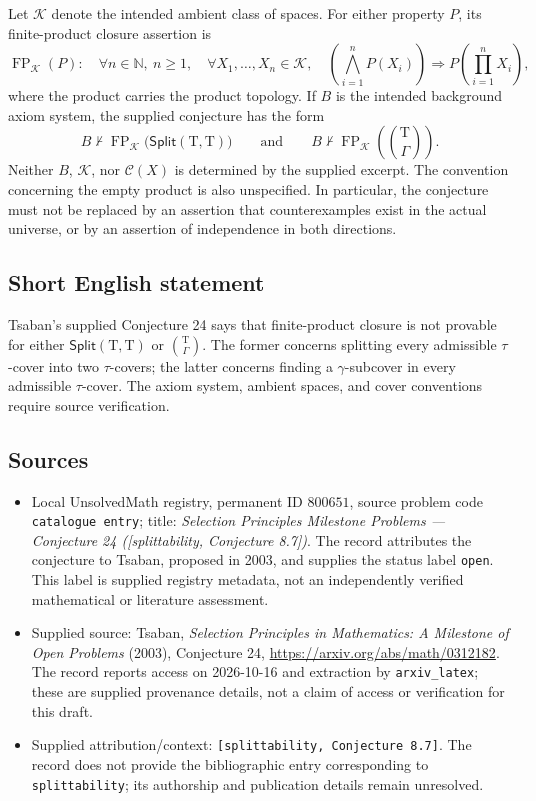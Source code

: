 \documentclass[11pt]{article}
\newcommand{\N}{\mathbb{N}}
\begin{document}
Let $\mathscr K$ denote the intended ambient class of spaces. For either property $P$, its finite-product closure assertion is
\[
\operatorname{FP}_{\mathscr K}(P):\quad
\forall n\in\N,\ n\geq1,\quad
\forall X_1,\ldots,X_n\in\mathscr K,\quad
\left(\bigwedge_{i=1}^{n}P(X_i)\right)
\Longrightarrow P\!\left(\prod_{i=1}^{n}X_i\right),
\]
where the product carries the product topology. If $B$ is the intended background axiom system, the supplied conjecture has the form
\[
B\nvdash\operatorname{FP}_{\mathscr K}\bigl(\mathsf{Split}(\mathrm T,\mathrm T)\bigr)
\qquad\text{and}\qquad
B\nvdash\operatorname{FP}_{\mathscr K}\!\left(\binom{\mathrm T}{\Gamma}\right).
\]
Neither $B$, $\mathscr K$, nor $\mathcal C(X)$ is determined by the supplied excerpt. The convention concerning the empty product is also unspecified. In particular, the conjecture must not be replaced by an assertion that counterexamples exist in the actual universe, or by an assertion of independence in both directions.
\subsection{Short English statement}
Tsaban's supplied Conjecture 24 says that finite-product closure is not provable for either $\mathsf{Split}(\mathrm T,\mathrm T)$ or $\binom{\mathrm T}{\Gamma}$. The former concerns splitting every admissible $\tau$-cover into two $\tau$-covers; the latter concerns finding a $\gamma$-subcover in every admissible $\tau$-cover. The axiom system, ambient spaces, and cover conventions require source verification.
\subsection{Sources}
\begin{itemize}
\item Local UnsolvedMath registry, permanent ID $800651$, source problem code \texttt{catalogue entry}; title: \emph{Selection Principles Milestone Problems --- Conjecture 24 ([splittability, Conjecture 8.7])}. The record attributes the conjecture to Tsaban, proposed in 2003, and supplies the status label \texttt{open}. This label is supplied registry metadata, not an independently verified mathematical or literature assessment.
\item Supplied source: Tsaban, \emph{Selection Principles in Mathematics: A Milestone of Open Problems} (2003), Conjecture 24, \url{https://arxiv.org/abs/math/0312182}. The record reports access on 2026-10-16 and extraction by \texttt{arxiv\_latex}; these are supplied provenance details, not a claim of access or verification for this draft.
\item Supplied attribution/context: \texttt{[splittability, Conjecture 8.7]}. The record does not provide the bibliographic entry corresponding to \texttt{splittability}; its authorship and publication details remain unresolved.
\end{itemize}
\end{document}
